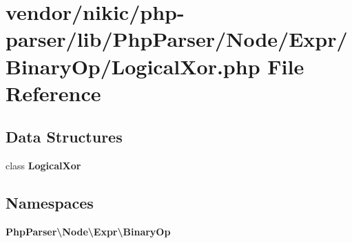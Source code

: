 \section{vendor/nikic/php-\/parser/lib/\+Php\+Parser/\+Node/\+Expr/\+Binary\+Op/\+Logical\+Xor.php File Reference}
\label{_logical_xor_8php}
\subsection*{Data Structures}
\begin{DoxyCompactItemize}
\item 
class {\bf Logical\+Xor}
\end{DoxyCompactItemize}
\subsection*{Namespaces}
\begin{DoxyCompactItemize}
\item 
 {\bf Php\+Parser\textbackslash{}\+Node\textbackslash{}\+Expr\textbackslash{}\+Binary\+Op}
\end{DoxyCompactItemize}
